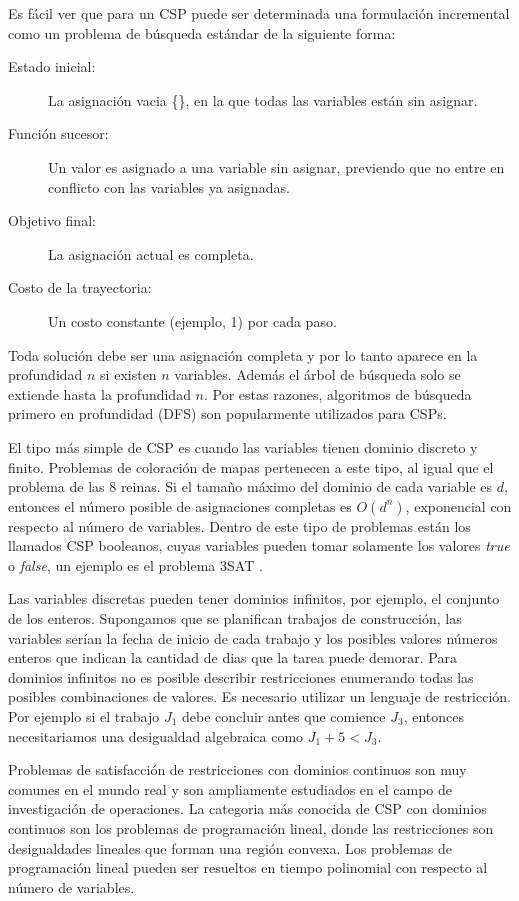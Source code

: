 Es f\'acil ver que para un CSP puede ser determinada una formulaci\'on incremental como un problema de búsqueda est\'andar de la siguiente forma:

\begin{description}
	\item[Estado inicial:] La asignaci\'on vacia \{\}, en la que todas las variables est\'an sin asignar.
	\item[Funci\'on sucesor:] Un valor es asignado a una variable sin asignar, previendo que no entre en conflicto con las variables ya asignadas.
	\item[Objetivo final:] La asignaci\'on actual es completa.
	\item[Costo de la trayectoria:] Un costo constante (ejemplo, 1) por cada paso.
\end{description}

Toda soluci\'on debe ser una asignaci\'on completa y por lo tanto aparece en la profundidad $n$ si existen $n$ variables. Adem\'as el \'arbol de búsqueda solo se extiende hasta la profundidad $n$. Por estas razones, algoritmos de b\'usqueda primero en profundidad (DFS) son popularmente utilizados para CSPs.

El tipo m\'as simple de CSP es cuando las variables tienen dominio discreto y finito. Problemas de coloraci\'on de mapas pertenecen a este tipo, al igual que el problema de las 8 reinas. Si el tamaño m\'aximo del dominio de cada variable es $d$, entonces el n\'umero posible de asignaciones completas es $O(d^{n})$, exponencial con respecto al n\'umero de variables. Dentro de este tipo de problemas est\'an los llamados CSP booleanos, cuyas variables pueden tomar solamente los valores \emph{true} o \emph{false}, un ejemplo es el problema 3SAT \cite{Carla P. Gomes}.

Las variables discretas pueden tener dominios infinitos, por ejemplo, el conjunto de los enteros. Supongamos que se planifican trabajos de construcci\'on, las variables ser\'ian la fecha de inicio de cada trabajo y los posibles valores n\'umeros enteros que indican la cantidad de dias que la tarea puede demorar. Para dominios infinitos no es posible describir restricciones enumerando todas las posibles combinaciones de valores. Es necesario utilizar un lenguaje de restricci\'on. Por ejemplo si el trabajo $J_{1}$ debe concluir antes que comience $J_{3}$, entonces necesitariamos una desigualdad algebraica como $J_{1} + 5 < J_{3}$.

Problemas de satisfacci\'on de restricciones con dominios continuos son muy comunes en el mundo real y son ampliamente estudiados en el campo de investigaci\'on de operaciones. La categoria m\'as conocida de CSP con dominios continuos son los problemas de programaci\'on lineal, donde las restricciones son desigualdades lineales que forman una regi\'on convexa. Los problemas de programaci\'on lineal pueden ser resueltos en tiempo polinomial con respecto al n\'umero de variables.

